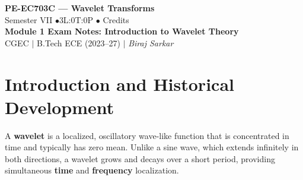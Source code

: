 \documentclass[12pt,a4paper]{article}
\begin{document}

\begin{center}
  {\LARGE\bfseries\color{myred} PE-EC703C --- Wavelet Transforms}\\[5pt]
  {\normalsize\color{mydark} Semester VII \quad$\bullet$\quad 3L:0T:0P \quad$\bullet$ Credits}\\[3pt]
  {\normalsize\color{myteal}\textbf{Module 1 Exam Notes: Introduction to Wavelet Theory}}\\[3pt]
  {\small\color{mydark} CGEC \;$|$\; B.Tech ECE (2023--27) \;$|$\; \textit{Biraj Sarkar}}
\end{center}
\noindent{\color{myred}\rule{\linewidth}{1.5pt}}
\vspace{2pt}

\hypersetup{linkcolor=mydark}
\tableofcontents
\hypersetup{linkcolor=myteal}
\newpage

\section{Introduction and Historical Development}

\begin{tcolorbox}[defbox, title={\textbf{Definition of a Wavelet}}]
A \textbf{wavelet} is a localized, oscillatory wave-like function that is concentrated in time and typically has zero mean. Unlike a sine wave, which extends infinitely in both directions, a wavelet grows and decays over a short period, providing simultaneous \textbf{time} and \textbf{frequency} localization.
\end{tcolorbox}
\end{document}

